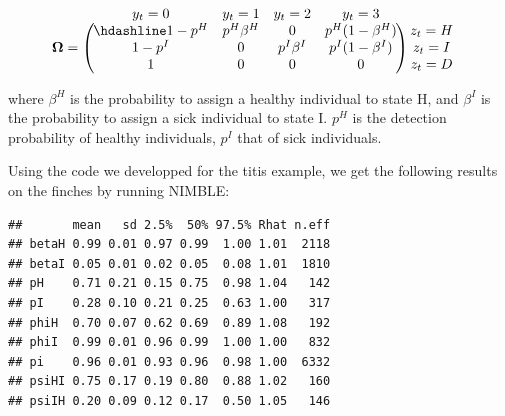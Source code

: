 \documentclass[
  12pt,
]{krantz}
\begin{document}
\[\begin{matrix}
& \\
\mathbf{\Omega} =
    \left ( \vphantom{ \begin{matrix} 12 \\ 12 \\ 12\end{matrix} } \right .
\end{matrix}
\hspace{-1.2em}
\begin{matrix}
    y_t=0 & y_t=1 & y_t=2 & y_t=3\\ \hdashline
1-p^H & p^H \beta^H & 0 & p^H (1-\beta^H)\\
1-p^I & 0 & p^{I} \beta^{I} & p^{I} (1-\beta^{I})\\
1 & 0 & 0 & 0
\end{matrix}
\hspace{-0.2em}
\begin{matrix}
& \\
\left . \vphantom{ \begin{matrix} 12 \\ 12 \\ 12\end{matrix} } \right )
    \begin{matrix}
    z_{t}=H \\ z_{t}=I \\ z_{t}=D
    \end{matrix}
\end{matrix}\]

where \(\beta^H\) is the probability to assign a healthy individual to state H, and \(\beta^{I}\) is the probability to assign a sick individual to state I. \(p^H\) is the detection probability of healthy individuals, \(p^I\) that of sick individuals.

Using the code we developped for the titis example, we get the following results on the finches by running NIMBLE:

\begin{verbatim}
##       mean   sd 2.5%  50% 97.5% Rhat n.eff
## betaH 0.99 0.01 0.97 0.99  1.00 1.01  2118
## betaI 0.05 0.01 0.02 0.05  0.08 1.01  1810
## pH    0.71 0.21 0.15 0.75  0.98 1.04   142
## pI    0.28 0.10 0.21 0.25  0.63 1.00   317
## phiH  0.70 0.07 0.62 0.69  0.89 1.08   192
## phiI  0.99 0.01 0.96 0.99  1.00 1.00   832
## pi    0.96 0.01 0.93 0.96  0.98 1.00  6332
## psiHI 0.75 0.17 0.19 0.80  0.88 1.02   160
## psiIH 0.20 0.09 0.12 0.17  0.50 1.05   146
\end{verbatim}
\end{document}
